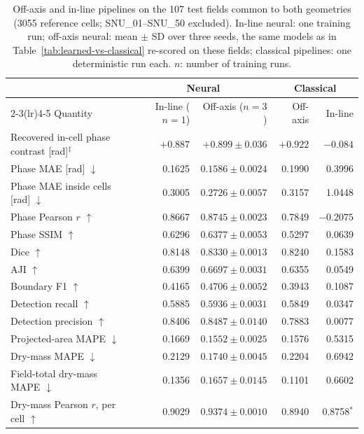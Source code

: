 \begin{table}[!htbp]
\centering
\caption{Off-axis and in-line pipelines on the 107 test fields common to both
geometries (3055 reference cells; SNU\_01--SNU\_50 excluded). In-line neural:
one training run; off-axis neural: mean $\pm$ SD over three seeds, the same
models as in Table~\ref{tab:learned-vs-classical} re-scored on these fields;
classical pipelines: one deterministic run each. $n$: number of training runs.}
\label{tab:common}
\footnotesize
\begin{tabular*}{\textwidth}{@{\extracolsep{\fill}}lrrrr@{}}
\toprule
 & \multicolumn{2}{c}{Neural} & \multicolumn{2}{c}{Classical} \\
\cmidrule(lr){2-3}\cmidrule(lr){4-5}
Quantity & In-line ($n=1$) & Off-axis ($n=3$) & Off-axis & In-line \\
\midrule
Recovered in-cell phase contrast [rad]$^{\ddagger}$ & $+0.887$ & $+0.899 \pm 0.036$ & $+0.922$ & $-0.084$ \\
\midrule
Phase MAE [rad] $\downarrow$ & 0.1625 & $0.1586 \pm 0.0024$ & 0.1990 & 0.3996 \\
Phase MAE inside cells [rad] $\downarrow$ & 0.3005 & $0.2726 \pm 0.0057$ & 0.3157 & 1.0448 \\
Phase Pearson $r$ $\uparrow$ & 0.8667 & $0.8745 \pm 0.0023$ & 0.7849 & $-0.2075$ \\
Phase SSIM $\uparrow$ & 0.6296 & $0.6377 \pm 0.0053$ & 0.5297 & 0.0639 \\
\midrule
Dice $\uparrow$ & 0.8148 & $0.8330 \pm 0.0013$ & 0.8240 & 0.1583 \\
AJI $\uparrow$ & 0.6399 & $0.6697 \pm 0.0031$ & 0.6355 & 0.0549 \\
Boundary F1 $\uparrow$ & 0.4165 & $0.4706 \pm 0.0052$ & 0.3943 & 0.1087 \\
Detection recall $\uparrow$ & 0.5885 & $0.5936 \pm 0.0031$ & 0.5849 & 0.0347 \\
Detection precision $\uparrow$ & 0.8406 & $0.8487 \pm 0.0140$ & 0.7883 & 0.0077 \\
\midrule
Projected-area MAPE $\downarrow$ & 0.1669 & $0.1552 \pm 0.0025$ & 0.1576 & 0.5315 \\
Dry-mass MAPE $\downarrow$ & 0.2129 & $0.1740 \pm 0.0045$ & 0.2204 & 0.6942 \\
Field-total dry-mass MAPE $\downarrow$ & 0.1356 & $0.1657 \pm 0.0145$ & 0.1101 & 0.6602 \\
\midrule
Dry-mass Pearson $r$, per cell $\uparrow$ & 0.9029 & $0.9374 \pm 0.0010$ & 0.8940 & 0.8758$^{\ast}$ \\

\end{tabular*}
\end{table}
